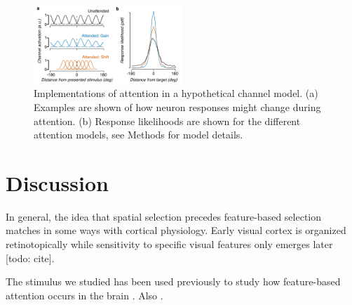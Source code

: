 \begin{figure}
\centering
\includegraphics[keepaspectratio,width=0.5\textwidth]{figs_c4/f5_channel_attention.pdf}
\caption[Attention in a channel model]{Implementations of attention in a hypothetical channel model. (a) Examples are shown of how neuron responses might change during attention. (b) Response likelihoods are shown for the different attention models, see Methods for model details.}
\label{fig:c4f7}
\end{figure}

\section{Discussion}



In general, the idea that spatial selection precedes feature-based selection matches in some ways with cortical physiology. Early visual cortex is organized retinotopically \citep{Wandell2007-pr} while sensitivity to specific visual features only emerges later [todo: cite]. 

The stimulus we studied has been used previously to study how feature-based attention occurs in the brain \citep{Saenz2003-qz}. Also \citep{Saenz2002-fs}.
